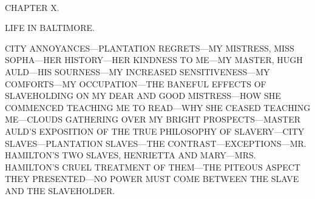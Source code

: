 {\protect\hypertarget{141}{}{}}

~

{CHAPTER X.}

LIFE IN BALTIMORE.

{CITY ANNOYANCES---PLANTATION REGRETS---MY MISTRESS, MISS SOPHA---HER
HISTORY---HER KINDNESS TO ME---MY MASTER, HUGH AULD---HIS SOURNESS---MY
INCREASED SENSITIVENESS---MY COMFORTS---MY OCCUPATION---THE BANEFUL
EFFECTS OF SLAVEHOLDING ON MY DEAR AND GOOD MISTRESS---HOW SHE COMMENCED
TEACHING ME TO READ---WHY SHE CEASED TEACHING ME---CLOUDS GATHERING OVER
MY BRIGHT PROSPECTS---MASTER AULD'S EXPOSITION OF THE TRUE PHILOSOPHY OF
SLAVERY---CITY SLAVES---PLANTATION SLAVES---THE
CONTRAST---EXCEPTIONS---MR. HAMILTON'S TWO SLAVES, HENRIETTA AND
MARY---MRS. HAMILTON'S CRUEL TREATMENT OF THEM---THE PITEOUS ASPECT THEY
PRESENTED---NO POWER MUST COME BETWEEN THE SLAVE AND THE SLAVEHOLDER.}

